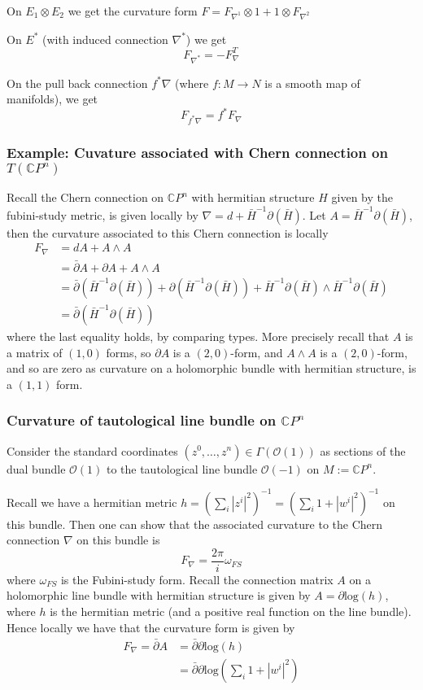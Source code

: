 \documentclass[a4paper]{article}
\theoremstyle{definition} \newtheorem*{definition}{Definition}
\theoremstyle{definition} \newtheorem*{definitions}{Definitions}
\theoremstyle{plain} \newtheorem{theorem}{Theorem}[section]
\theoremstyle{plain} \newtheorem{proposition}[theorem]{Proposition}
\theoremstyle{plain} \newtheorem{corollary}[theorem]{Corollary}
\theoremstyle{plain} \newtheorem{lemma}[theorem]{Lemma}
\theoremstyle{plain} \newtheorem{example}[theorem]{Example}
\newcommand{\complexnos}{\mathbb{C}}
\begin{document}
On $E_1\otimes E_2$ we get the curvature form
$F=F_{\nabla^1}\otimes 1 + 1\otimes F_{\nabla^2}$

On $E^*$ (with induced connection $\nabla^*$) we get
$$F_{\nabla^*}=-F_{\nabla}^T$$

On the pull back connection $f^*\nabla$ (where $f:M\to N$ is a smooth map of manifolds), we get
$$F_{f^* \nabla} = f^* F_\nabla$$

\subsubsection{Example: Cuvature associated with Chern connection on $T (\complexnos P^n)$}

Recall the Chern connection on $\complexnos P^n$ with hermitian structure $H$ given by the fubini-study metric, is given locally by $\nabla = d+\bar{H}^{-1}\partial(\bar{H})$. Let $A=\bar{H}^{-1}\partial(\bar{H})$, then the curvature associated to this Chern connection is locally 
\begin{align*}
    F_\nabla & = dA + A\wedge A \\
    & = \bar{\partial} A + \partial A + A\wedge A \\
    & = \bar{\partial}(\bar{H}^{-1}\partial(\bar{H})) + \partial(\bar{H}^{-1}\partial(\bar{H})) + \bar{H}^{-1}\partial(\bar{H}) \wedge \bar{H}^{-1}\partial(\bar{H}) \\
    & = \bar{\partial}(\bar{H}^{-1}\partial(\bar{H}))
\end{align*}
where the last equality holds, by comparing types. More precisely recall that $A$ is a matrix of $(1, 0)$ forms, so $\partial A$ is a $(2,0)$-form, and $A\wedge A$ is a $(2,0)$-form, and so are zero as curvature on a holomorphic bundle with hermitian structure, is a $(1,1)$ form.

\subsubsection{Curvature of tautological line bundle on $\complexnos P^n$}
Consider the standard coordinates $(z^0, \ldots, z^n)\in \Gamma(\mathcal{O}(1))$ as sections of the dual bundle $\mathcal{O}(1)$ to the tautological line bundle $\mathcal{O}(-1)$ on $M:=\complexnos P^n$. 

 Recall we have a hermitian metric $h=(\sum_i |z^i|^2)^{-1}=(\sum_i 1+|w^i|^2)^{-1}$ on this bundle. Then one can show that the associated curvature to the Chern connection $\nabla$ on this bundle is
$$F_\nabla = \frac{2\pi}{i} \omega_{FS} $$
where $\omega_{FS}$ is the Fubini-study form. Recall the connection matrix $A$ on a holomorphic line bundle with hermitian structure is given by $A = \partial \text{log}(h)$, where $h$ is the hermitian metric (and a positive real function on the line bundle). Hence locally we have that the curvature form is given by 
\begin{align*}
F_\nabla = \bar{\partial}A & =  \bar{\partial}\partial \text{log}(h) \\
& = \bar{\partial}\partial \text{log}(\sum_i 1+|w^i|^2)
\end{align*}
\end{document}
